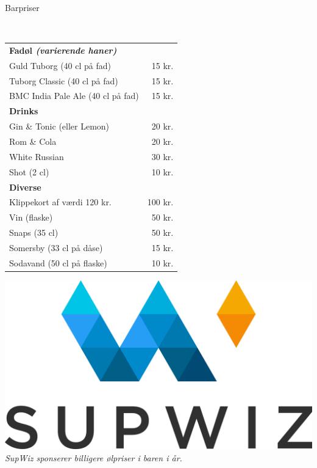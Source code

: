 \begin{flushleft}
\begin{huge}
Barpriser
\end{huge}
\\[.1cm]
\begin{table}[h!]
\begin{tabular}{lr}
\textbf{Fadøl \emph{(varierende haner)}} & \\
Guld Tuborg (40 cl på fad) & 15 kr.\\
Tuborg Classic (40 cl på fad) & 15 kr.\\
BMC India Pale Ale (40 cl på fad) & 15 kr.\\[2ex]
\textbf{Drinks} & \\
Gin \& Tonic (eller Lemon) & 20 kr.\\
Rom \& Cola & 20 kr.\\
White Russian & 30 kr.\\
Shot (2 cl) & 10 kr.\\[2ex]
\textbf{Diverse} & \\
Klippekort af værdi 120 kr. & 100 kr.\\
Vin (flaske) & 50 kr.\\
Snaps (35 cl) & 50 kr.\\
Somersby (33 cl på dåse) & 15 kr. \\
Sodavand (50 cl på flaske) & 10 kr.\\
\end{tabular}
\end{table}
\end{flushleft}
\vfill
\begin{center}
\includegraphics[width=.9\linewidth]{supwiz.pdf}
\\[2mm]\emph{SupWiz sponserer billigere ølpriser i baren i år.}
\end{center}
